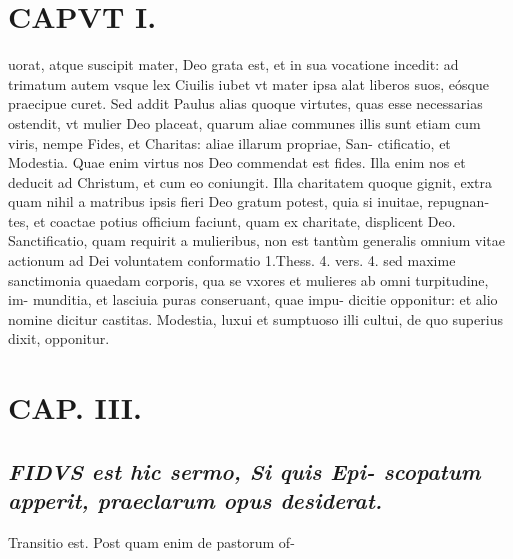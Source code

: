 \documentclass{article}
\begin{document}
\begin{pages}
\section*{CAPVT I. }
\marginpar{[ p.91 ]}\pstart uorat, atque suscipit mater, Deo grata est, et in sua vocatione incedit: ad trimatum autem vsque lex Ciuilis iubet vt mater ipsa alat liberos suos, eósque praecipue curet.  \pend\pstart Sed addit Paulus alias quoque virtutes, quas esse necessarias ostendit, vt mulier Deo placeat, quarum aliae communes illis sunt etiam cum viris, nempe Fides, et Charitas: aliae illarum propriae, San- ctificatio, et Modestia. Quae enim virtus nos Deo commendat est fides. Illa enim nos et deducit ad Christum, et cum eo coniungit. Illa charitatem quoque gignit, extra quam nihil a matribus ipsis fieri Deo gratum potest, quia si inuitae, repugnan- tes, et coactae potius officium faciunt, quam ex charitate, displicent Deo.  \pend\pstart Sanctificatio, quam requirit a mulieribus, non est tantùm generalis omnium vitae actionum ad Dei voluntatem conformatio 1.Thess. 4. vers. 4. sed maxime sanctimonia quaedam corporis, qua se vxores et mulieres ab omni turpitudine, im- munditia, et lasciuia puras conseruant, quae impu- dicitie opponitur: et alio nomine dicitur castitas. Modestia, luxui et sumptuoso illi cultui, de quo superius dixit, opponitur.  \pend
\endnumbering\beginnumbering\section{CAP. III.}
{}
\subsection*{\textit{\huge\textbf{F}\normalsize IDVS est hic sermo, Si quis Epi- scopatum apperit, praeclarum opus desiderat. }}\pstart Transitio est. Post quam enim de pastorum of-  \pend

\end{pages}
\end{document}

